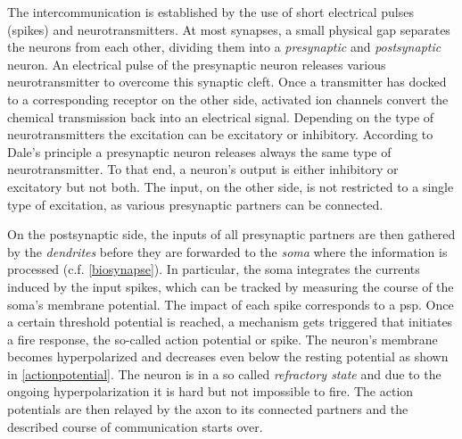 The intercommunication is established by the use of short electrical pulses (spikes) and neurotransmitters. At most synapses, a small physical gap separates the neurons from each other, dividing them into a \emph{presynaptic} and \emph{postsynaptic} neuron. An electrical pulse of the presynaptic neuron releases various neurotransmitter to overcome this synaptic cleft. Once a transmitter has docked to a corresponding receptor on the other side, activated ion channels convert the chemical transmission back into an electrical signal. Depending on the type of neuro\-transmitters the excitation  can be excitatory or inhibitory. According to Dale's principle a presynaptic neuron releases always the same type of neurotransmitter. To that end, a neuron's output is either inhibitory or excitatory but not both. The input, on the other side, is not restricted to a single type of excitation, as various presynaptic partners can be connected.

On the postsynaptic side, the inputs of all presynaptic partners are then gathered by the \emph{dendrites} before they are forwarded to the \emph{soma} where the information is processed (c.f. \cref{biosynapse}). In particular, the soma integrates the currents induced by the input spikes, which can be tracked by measuring the course of the soma's membrane potential. The impact of each spike corresponds to a \gls{psp}. Once a certain threshold potential is reached, a mechanism gets triggered that initiates a fire response, the so-called action potential or spike. The neuron's membrane becomes hyperpolarized and decreases even below the resting potential as shown in \cref{actionpotential}. The neuron is in a so called \emph{refractory state} and due to the ongoing hyperpolarization it is hard but not impossible to fire. The action potentials are then relayed by the axon to its connected partners and the described course of communication starts over. 

